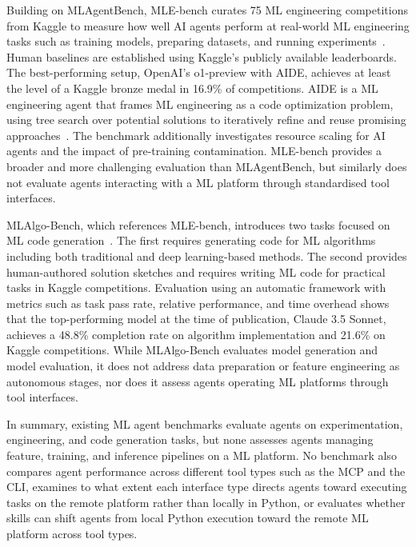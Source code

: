 \documentclass[
english,                 %
bibtex,                  %
includeExtraAbstracts, %
]{kththesis}
\numberwithin{listing}{chapter}
\begin{document}
Building on \gls{ML}AgentBench, \gls{MLE}-bench curates 75 \gls{ML} engineering competitions from Kaggle to measure how well \gls{AI} agents perform at real-world \gls{ML} engineering tasks such as training models, preparing datasets, and running experiments~\cite{chan_mle-bench_2025}. Human baselines are established using Kaggle's publicly available leaderboards. The best-performing setup, Open\Gls{AI}'s o1-preview with \gls{AIDE}, achieves at least the level of a Kaggle bronze medal in 16.9\% of competitions. \Gls{AIDE} is a \gls{ML} engineering agent that frames ML engineering as a code optimization problem, using tree search over potential solutions to iteratively refine and reuse promising approaches~\cite{jiang_aide_2025}. The benchmark additionally investigates resource scaling for \gls{AI} agents and the impact of pre-training contamination. \Gls{MLE}-bench provides a broader and more challenging evaluation than \gls{ML}AgentBench, but similarly does not evaluate agents interacting with a \gls{ML} platform through standardised tool interfaces.

\gls{ML}Algo-Bench, which references \gls{MLE}-bench, introduces two tasks focused on \gls{ML} code generation~\cite{wang_mlalgo-bench_2025}. The first requires generating code for \gls{ML} algorithms including both traditional and deep learning-based methods. The second provides human-authored solution sketches and requires writing \gls{ML} code for practical tasks in Kaggle competitions. Evaluation using an automatic framework with metrics such as task pass rate, relative performance, and time overhead shows that the top-performing model at the time of publication, Claude 3.5 Sonnet, achieves a 48.8\% completion rate on algorithm implementation and 21.6\% on Kaggle competitions. While \gls{ML}Algo-Bench evaluates model generation and model evaluation, it does not address data preparation or feature engineering as autonomous stages, nor does it assess agents operating \gls{ML} platforms through tool interfaces.

In summary, existing \gls{ML} agent benchmarks evaluate agents on experimentation, engineering, and code generation tasks, but none assesses agents managing feature, training, and inference pipelines on a \gls{ML} platform. No benchmark also compares agent performance across different tool types such as the \gls{MCP} and the \gls{CLI}, examines to what extent each interface type directs agents toward executing tasks on the remote platform rather than locally in Python, or evaluates whether skills can shift agents from local Python execution toward the remote \gls{ML} platform across tool types.
\end{document}

